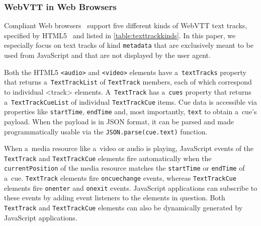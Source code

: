 \documentclass{sig-alternate}
\begin{document}
\subsubsection{WebVTT in Web Browsers}

Compliant Web browsers~\cite{dutton2012trackelement}
support five different kinds of
WebVTT text tracks, specified by HTML5~\cite{berjon2013html5}
and listed in \autoref{table:texttrackkinds}.
In this paper, we especially focus on
text tracks of kind \texttt{metadata}
that are exclusively meant to be used from JavaScript and
that are not displayed by the user agent.

Both the HTML5 \texttt{<audio>} and \texttt{<video>} elements
have a~\texttt{textTracks} property
that returns a~\texttt{TextTrackList} of
\texttt{TextTrack} members, each of which correspond
to individual <track> elements.
A~\texttt{TextTrack} has a~\texttt{cues} property
that returns a~\texttt{TextTrackCueList} of individual
\texttt{TextTrackCue} items.
Cue data is accessible via properties like
\texttt{startTime}, \texttt{endTime} and,
most importantly, \texttt{text} to obtain a~cue's payload.
When the payload is in JSON format,
it can be parsed and made programmatically usable via the
\texttt{JSON.parse(cue.text)} function.

When a~media resource like a~video or audio is playing,
JavaScript events of the \texttt{TextTrack} and \texttt{TextTrackCue}
elements fire automatically when the \texttt{currentPosition}
of the media resource matches the
\texttt{startTime} or \texttt{endTime} of a~cue.
\texttt{TextTrack} elements fire \texttt{oncuechange} events,
whereas \texttt{TextTrackCue} elements fire
\texttt{onenter} and \texttt{onexit} events.
JavaScript applications can subscribe to these events
by adding event listeners to the elements in question.
Both \texttt{TextTrack} and \texttt{TextTrackCue} elements
can also be dynamically generated by JavaScript applications.

\end{document}
